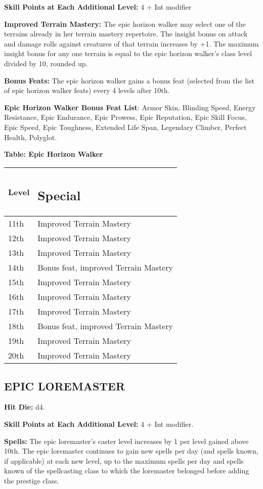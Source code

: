 \documentclass{article}
\begin{document}
\textbf{Skill Points at Each Additional Level: }4 + Int modifier

\textbf{Improved Terrain Mastery: }The epic horizon walker may select one of the 
terrains already in her terrain mastery repertoire. The insight bonus on attack 
and damage rolls against creatures of that terrain increases by +1. The maximum 
insight bonus for any one terrain is equal to the epic horizon walker's class level 
divided by 10, rounded up.

\textbf{Bonus Feats: }The epic horizon walker gains a bonus feat (selected from 
the list of epic horizon walker feats) every 4 levels after 10th.

\textbf{Epic Horizon Walker Bonus Feat List}: Armor Skin, Blinding Speed, Energy 
Resistance, Epic Endurance, Epic Prowess, Epic Reputation, Epic Skill Focus, Epic 
Speed, Epic Toughness, Extended Life Span, Legendary Climber, Perfect Health, Polyglot.

\textbf{Table: Epic Horizon Walker}

\begin{tabular}{|>{\raggedright}p{27pt}|>{\raggedright}p{157pt}|}
\hline
L\textbf{evel} & \subsection*{S\textbf{pecial}}\tabularnewline
\hline
11th & Improved Terrain Mastery\tabularnewline
\hline
12th  & Improved Terrain Mastery\tabularnewline
\hline
13th  & Improved Terrain Mastery\tabularnewline
\hline
14th  & Bonus feat, improved Terrain Mastery\tabularnewline
\hline
15th  & Improved Terrain Mastery\tabularnewline
\hline
16th  & Improved Terrain Mastery\tabularnewline
\hline
17th  & Improved Terrain Mastery\tabularnewline
\hline
18th  & Bonus feat, improved Terrain Mastery\tabularnewline
\hline
19th  & Improved Terrain Mastery\tabularnewline
\hline
20th & Improved Terrain Mastery\tabularnewline
\hline
\end{tabular}

\vspace{12pt}
\subsection*{{\LARGE{}EPIC LOREMASTER }}

\textbf{Hit Die:} d4. 

\textbf{Skill Points at Each Additional Level:} 4 + Int modifier. 

\textbf{Spells:} The epic loremaster's caster level increases by 1 per level gained 
above 10th. The epic loremaster continues to gain new spells per day (and spells 
known, if applicable) at each new level, up to the maximum spells per day and spells 
known of the spellcasting class to which the loremaster belonged before adding 
the prestige class.
\end{document}
